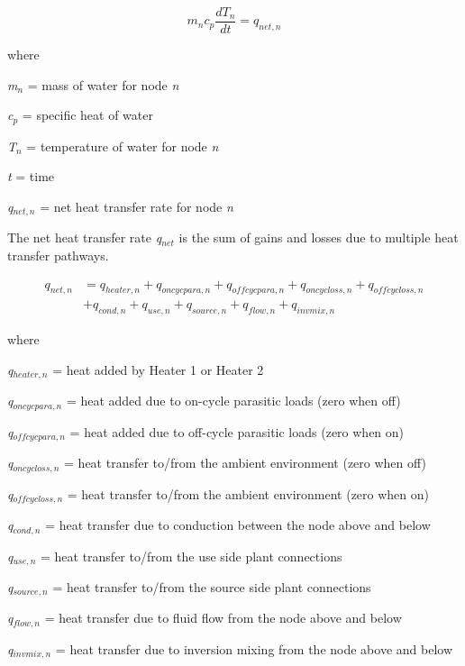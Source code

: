 \begin{equation}
{m_n}{c_p}\frac{{d{T_n}}}{{dt}} = {q_{net,n}}
\end{equation}

where

\emph{m\(_{n}\)} = mass of water for node \emph{n}

\emph{c\(_{p}\)} = specific heat of water

\emph{T\(_{n}\)} = temperature of water for node \emph{n}

\emph{t} = time

\emph{q\(_{net,n}\)} = net heat transfer rate for node \emph{n}

The net heat transfer rate \emph{q\(_{net}\)} is the sum of gains and losses due to multiple heat transfer pathways.

\begin{equation}
  \begin{array}{ll}
    q_{net,n} &= q_{heater,n} + q_{oncycpara,n} + q_{offcycpara,n} + q_{oncycloss,n} + q_{offcycloss,n} \\ 
              &+ q_{cond,n} + q_{use,n} + q_{source,n} + q_{flow,n} + q_{invmix,n}
  \end{array}
\end{equation}

where

\emph{q\(_{heater,n}\)} = heat added by Heater 1 or Heater 2

\emph{q\(_{oncycpara,n}\)} = heat added due to on-cycle parasitic loads (zero when off)

\emph{q\(_{offcycpara,n}\)} = heat added due to off-cycle parasitic loads (zero when on)

\emph{q\(_{oncycloss,n}\)} = heat transfer to/from the ambient environment (zero when off)

\emph{q\(_{offcycloss,n}\)} = heat transfer to/from the ambient environment (zero when on)

\emph{q\(_{cond,n}\)} = heat transfer due to conduction between the node above and below

\emph{q\(_{use,n}\)} = heat transfer to/from the use side plant connections

\emph{q\(_{source,n}\)} = heat transfer to/from the source side plant connections

\emph{q\(_{flow,n}\)} = heat transfer due to fluid flow from the node above and below

\emph{q\(_{invmix,n}\)} = heat transfer due to inversion mixing from the node above and below

